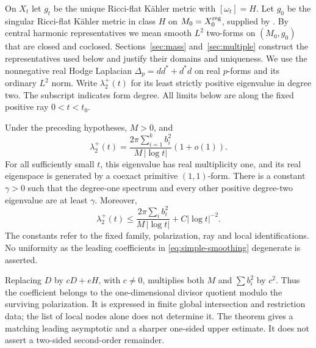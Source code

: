On $X_t$ let $g_t$ be the unique Ricci-flat K\"ahler metric with
$[\omega_t]=H$. Let $g_0$ be the singular Ricci-flat K\"ahler metric
in class $H$ on $M_0=X_0^{\mathrm{reg}}$, supplied by \cite{egz,hein-sun}.
By central harmonic representatives we mean smooth $L^2$ two-forms
on $(M_0,g_0)$ that are closed and coclosed. Sections~\ref{sec:mass}
and~\ref{sec:multiple} construct the representatives used below and
justify their domains and uniqueness. We use the nonnegative real Hodge Laplacian
$\Delta_p=dd^*+d^*d$ on real $p$-forms and its ordinary $L^2$ norm.
Write $\lambda_2^+(t)$ for its least strictly positive eigenvalue in
degree two. The subscript indicates form degree. All limits below are
along the fixed positive ray $0<t<t_0$.

\begin{theorem}\label{thm:main}
Under the preceding hypotheses, $M>0$, and
\begin{equation}\label{eq:main-law}
 \lambda_2^+(t)=
 \frac{2\pi\sum_{i=1}^k b_i^2}{M\,|\log t|}(1+o(1)).
\end{equation}
For all sufficiently small $t$, this eigenvalue has real multiplicity one,
and its real eigenspace is generated by a coexact primitive $(1,1)$-form.
There is a constant $\gamma>0$ such that the degree-one spectrum and every
other positive degree-two eigenvalue are at least $\gamma$.
Moreover,
\begin{equation}\label{eq:main-upper}
 \lambda_2^+(t)\le
 \frac{2\pi\sum_i b_i^2}{M\,|\log t|}+C|\log t|^{-2}.
\end{equation}
The constants refer to the fixed family, polarization, ray and local
identifications. No uniformity as the leading coefficients in
\eqref{eq:simple-smoothing} degenerate is asserted.
\end{theorem}

Replacing $D$ by $cD+eH$, with $c\ne0$, multiplies both $M$ and
$\sum b_i^2$ by $c^2$. Thus the coefficient belongs to the one-dimensional
divisor quotient modulo the surviving polarization. It is expressed in
finite global intersection and restriction data; the list of local nodes
alone does not determine it. The theorem gives a matching leading
asymptotic and a sharper one-sided upper estimate. It does not assert a
two-sided second-order remainder.

